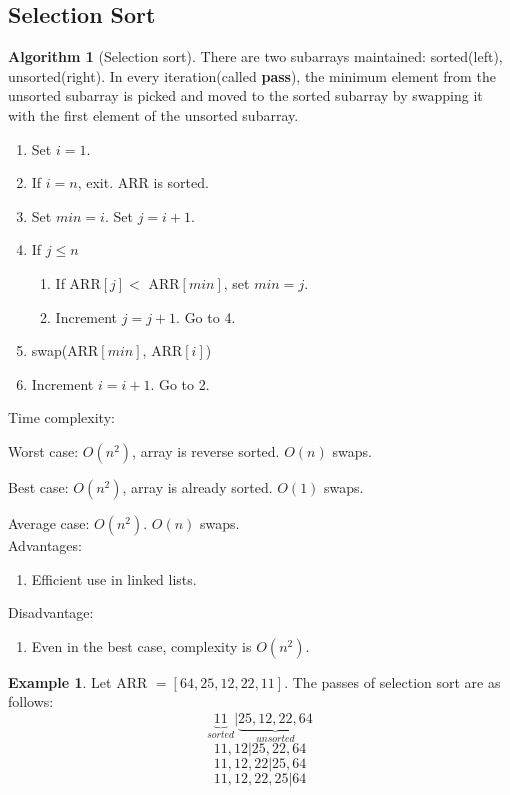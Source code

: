 \documentclass[10pt, a4paper]{extarticle}
\theoremstyle{definition}
\newtheorem{alg}{Algorithm}
\newtheorem{eg}{Example}
\begin{document}
\subsection{Selection Sort}
\begin{alg}[Selection sort]
	There are two subarrays maintained: sorted(left), unsorted(right). In every iteration(called \textbf{pass}), the minimum element from the unsorted subarray is picked and moved to the sorted subarray by swapping it with the first element of the unsorted subarray.
	\begin{enumerate}
		\item Set $i=1$.
		\item If $i= n$, exit. ARR is sorted.
		\item Set $min=i$. Set $j=i+1$.
		\item If $j\leq n$
		      \begin{enumerate}
			      \item If ARR$[j]<$ ARR$[min]$, set $min=j$.
			      \item Increment $j=j+1$. Go to 4.
		      \end{enumerate}
		\item swap(ARR$[min]$, ARR$[i]$)
		\item Increment $i=i+1$. Go to 2.


	\end{enumerate}
	Time complexity:

	Worst case: $O(n^2)$, array is reverse sorted. $O(n)$ swaps.

	Best case: $O(n^2)$, array is already sorted. $O(1)$ swaps.

	Average case: $O(n^2)$. $O(n)$ swaps.
	\hfill\\
	Advantages:
	\begin{enumerate}
		\item Efficient use in linked lists.
	\end{enumerate}
	Disadvantage:
	\begin{enumerate}
		\item Even in the best case, complexity is $O(n^2)$.
	\end{enumerate}
\end{alg}

\begin{eg}
	Let ARR $=[64,25,12,22,11]$. The passes of selection sort are as follows:
	\[\underbrace{11}_{sorted}|\underbrace{25,12,22,64}_{unsorted}\]
	\[11,12|25,22,64\]
	\[11,12,22|25,64\]
	\[11,12,22,25|64\tag*{(sorted)}\]
\end{eg}
\end{document}
